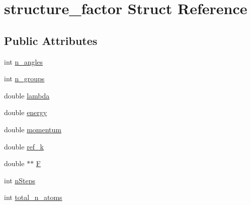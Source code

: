 \hypertarget{structstructure__factor}{\section{structure\-\_\-factor \-Struct \-Reference}
\label{structstructure__factor}
}
\subsection*{\-Public \-Attributes}
\begin{DoxyCompactItemize}
\item 
int \hyperlink{structstructure__factor_abbbc74ac89a0e9a915cec36ef575ea07}{n\-\_\-angles}
\item 
int \hyperlink{structstructure__factor_a247c244fcc69451b2ea8aa55d1de80f2}{n\-\_\-groups}
\item 
double \hyperlink{structstructure__factor_a24b318a6153cd023383ada6351b658c9}{lambda}
\item 
double \hyperlink{structstructure__factor_a295c079f3e3cc73169e80864ce27c38a}{energy}
\item 
double \hyperlink{structstructure__factor_a0d988adee7b47ea298c4d4185867fe30}{momentum}
\item 
double \hyperlink{structstructure__factor_a1e91547f9f5cb127b296878a2bbaee8a}{ref\-\_\-k}
\item 
double $\ast$$\ast$ \hyperlink{structstructure__factor_a29bc6b4831e2d086d7120e53e263ec90}{\-F}
\item 
int \hyperlink{structstructure__factor_a2097f05e9640df0b9a783213601a2007}{n\-Steps}
\item 
int \hyperlink{structstructure__factor_a7d26b02199094812c82409bebca4809e}{total\-\_\-n\-\_\-atoms}
\end{DoxyCompactItemize}


